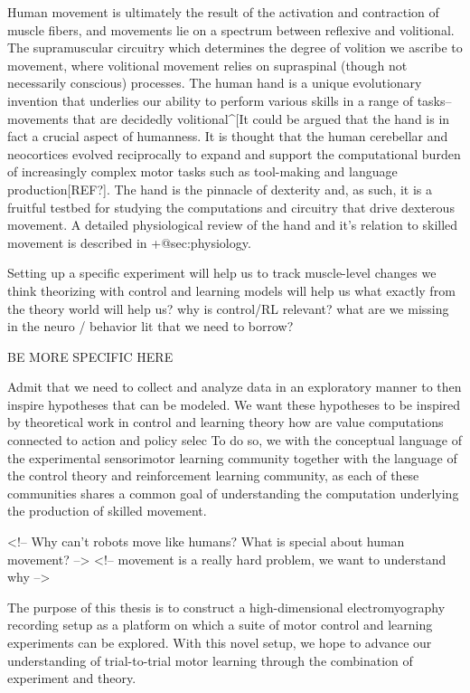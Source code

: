 \documentclass[../main.tex]{subfiles}
\begin{document}
Human movement is ultimately the result of the activation and contraction of muscle fibers, and movements lie on a spectrum between reflexive and volitional. The supramuscular circuitry which determines the degree of volition we ascribe to movement, where volitional movement relies on supraspinal (though not necessarily conscious) processes. The human hand is a unique evolutionary invention that underlies our ability to perform various skills in a range of tasks-- movements that are decidedly volitional^[It could be argued that the hand is in fact a crucial aspect of humanness. It is thought that the human cerebellar and neocortices evolved reciprocally to expand and support the computational burden of increasingly complex motor tasks such as tool-making and language production[REF?]. The hand is the pinnacle of dexterity and, as such, it is a fruitful testbed for studying the computations and circuitry that drive dexterous movement. A detailed physiological review of the hand and it's relation to skilled movement is described in {+@sec:physiology}.

Setting up a specific experiment will help us to track muscle-level changes
we think theorizing with control and learning models will help us
what exactly from the theory world will help us? why is control/RL relevant?
what are we missing in the neuro / behavior lit that we need to borrow?

BE MORE SPECIFIC HERE

Admit that we need to collect and analyze data in an exploratory manner to then inspire hypotheses that can be modeled. We want these hypotheses to be inspired by theoretical work in control and learning theory
how are value computations connected to action and policy selec
To do so, we with the conceptual language of the experimental sensorimotor learning community together with the language of the control theory and reinforcement learning community, as each of these communities shares a common goal of understanding the computation underlying the production of skilled movement.


<!-- Why can't robots move like humans? What is special about human movement? -->
<!-- movement is a really hard problem, we want to understand why -->

The purpose of this thesis is to construct a high-dimensional electromyography recording setup as a platform on which a suite of motor control and learning experiments can be explored. With this novel setup, we hope to advance our understanding of trial-to-trial motor learning through the combination of experiment and theory.
\end{document}
